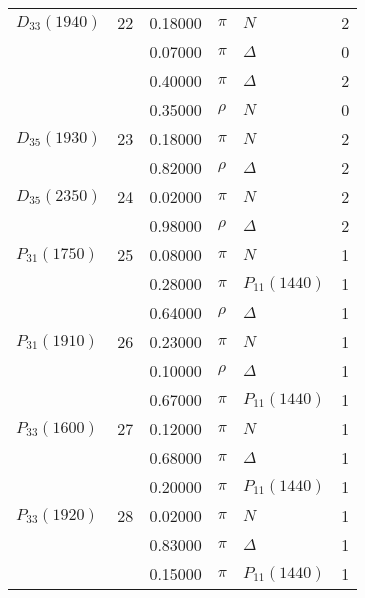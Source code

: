 \documentclass[a4paper,10pt]{article}
\begin{document}
\begin{tabular}[t]{|lr|l|ll|l|}
\hline
$      D_{33}(1940)  $& 22& 0.18000&$ \pi                 $ &$ N                   $& 2\\
$                    $&   & 0.07000&$ \pi                 $ &$ \Delta              $& 0\\
$                    $&   & 0.40000&$ \pi                 $ &$ \Delta              $& 2\\
$                    $&   & 0.35000&$ \rho                $ &$ N                   $& 0\\
\hline
$      D_{35}(1930)  $& 23& 0.18000&$ \pi                 $ &$ N                   $& 2\\
$                    $&   & 0.82000&$ \rho                $ &$ \Delta              $& 2\\
\hline
$      D_{35}(2350)  $& 24& 0.02000&$ \pi                 $ &$ N                   $& 2\\
$                    $&   & 0.98000&$ \rho                $ &$ \Delta              $& 2\\
\hline
$      P_{31}(1750)  $& 25& 0.08000&$ \pi                 $ &$ N                   $& 1\\
$                    $&   & 0.28000&$ \pi                 $ &$ P_{11}(1440)        $& 1\\
$                    $&   & 0.64000&$ \rho                $ &$ \Delta              $& 1\\
\hline
$      P_{31}(1910)  $& 26& 0.23000&$ \pi                 $ &$ N                   $& 1\\
$                    $&   & 0.10000&$ \rho                $ &$ \Delta              $& 1\\
$                    $&   & 0.67000&$ \pi                 $ &$ P_{11}(1440)        $& 1\\
\hline
$      P_{33}(1600)  $& 27& 0.12000&$ \pi                 $ &$ N                   $& 1\\
$                    $&   & 0.68000&$ \pi                 $ &$ \Delta              $& 1\\
$                    $&   & 0.20000&$ \pi                 $ &$ P_{11}(1440)        $& 1\\
\hline
$      P_{33}(1920)  $& 28& 0.02000&$ \pi                 $ &$ N                   $& 1\\
$                    $&   & 0.83000&$ \pi                 $ &$ \Delta              $& 1\\
$                    $&   & 0.15000&$ \pi                 $ &$ P_{11}(1440)        $& 1\\

\end{tabular}
\end{document}
